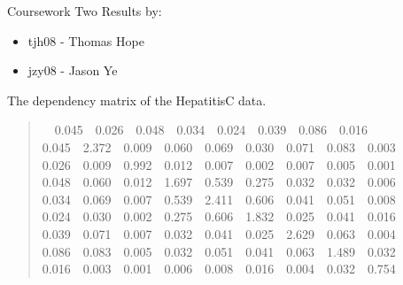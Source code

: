 \documentclass[a4paper]{article}
\begin{document}
Coursework Two Results by:
%
\begin{itemize}

\item tjh08 - Thomas Hope

\item jzy08 - Jason Ye

\end{itemize}

The dependency matrix of the HepatitisC data.
%
\begin{quote}{\ttfamily \raggedright {}~~0.045~~0.026~~0.048~~0.034~~0.024~~0.039~~0.086~~0.016\\
0.045~~2.372~~0.009~~0.060~~0.069~~0.030~~0.071~~0.083~~0.003\\
0.026~~0.009~~0.992~~0.012~~0.007~~0.002~~0.007~~0.005~~0.001\\
0.048~~0.060~~0.012~~1.697~~0.539~~0.275~~0.032~~0.032~~0.006\\
0.034~~0.069~~0.007~~0.539~~2.411~~0.606~~0.041~~0.051~~0.008\\
0.024~~0.030~~0.002~~0.275~~0.606~~1.832~~0.025~~0.041~~0.016\\
0.039~~0.071~~0.007~~0.032~~0.041~~0.025~~2.629~~0.063~~0.004\\
0.086~~0.083~~0.005~~0.032~~0.051~~0.041~~0.063~~1.489~~0.032\\
0.016~~0.003~~0.001~~0.006~~0.008~~0.016~~0.004~~0.032~~0.754
}
\end{quote}
\end{document}
